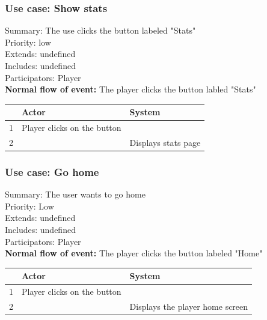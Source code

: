 \documentclass{article}
\begin{document}
\subsubsection{Use case: Show stats}
Summary: The use clicks the button labeled "Stats"\\
Priority: low\\
Extends: undefined\\
Includes: undefined\\
Participators: Player\\
\textbf{Normal flow of event:} The player clicks the button labled "Stats"
\vspace{1 mm}\\
\begin{tabular}{|c|l|l|} \hline
      & Actor & System \\ \hline
    1 & Player clicks on the button & \\ \hline
    2 & & Displays stats page \\ \hline
\end{tabular} 

\subsubsection{Use case: Go home}
Summary: The user wants to go home\\
Priority: Low \\
Extends: undefined\\
Includes: undefined\\
Participators: Player \\
\textbf{Normal flow of event:} The player clicks the button labeled "Home"
\vspace{1 mm}\\
\begin{tabular}{|c|l|l|} \hline
      & Actor & System \\ \hline
    1 & Player clicks on the button & \\ \hline
    2 & & Displays the player home screen \\ \hline
\end{tabular} 
\end{document}

